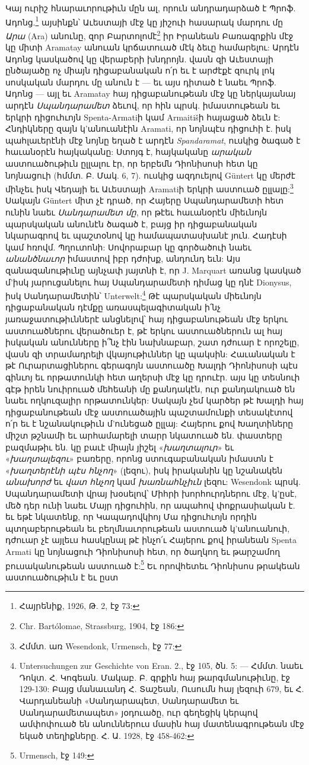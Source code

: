 \documentclass{article}
\begin{document}
{Կայ ուրիշ հնարաւորութիւն մըն ալ, որուն անդրադարձած է Պրոֆ. Ադոնց.\footnote{Հայրենիք, 1926, Թ. 2, էջ 73:} այսինքն՝ Աւեստայի մէջ կը յիշուի հասարակ մարդու մը \emph{Արա} (Ara) անունը, զոր Բարտոլոմէ\footnote{Chr. Bartólomae, Strassburg, 1904, էջ 186:} իր Իրանեան Բառագրքին մէջ կը միտի Aramatay անուան կրճատուած մէկ ձեւը համարելու: Արդէն Ադոնց կասկածով կը վերաբերի խնդրոյն. վասն զի Աւեստայի ընծայածը ոչ միայն դիցաբանական ո՛ր եւ է արժէքէ զուրկ լոկ սոսկական մարդու մը անուն է — եւ այս դիտած է նաեւ Պրոֆ. Ադոնց — այլ եւ Aramatay հայ դիցաբանութեան մէջ կը ներկայանայ արդէն \emph{Սպանդարամետ} ձեւով, որ հին պրսկ. իմաստութեան եւ երկրի դիցուհւոյն Spenta-Armatiի կամ Armaitišի հայացած ձեւն է: Հնդիկները զայն կ'անուանէին Aramati, որ նոյնպէս դիցուհի է. իսկ պահլաւերէնի մէջ նոյնը եղած է արդէն \emph{Spandaramat}, ուսկից ծագած է հաւանօրէն հայկականը: Ստոյգ է, հայկականը \emph{արական} աստուածութիւն ըլլալու էր, որ երբեմն Դիոնիսոսի հետ կը նոյնացուի (հմմտ. Բ. Մակ. 6, 7). ուսկից ազդուելով Güntert կը մերժէ մինչեւ իսկ Վեդայի եւ Աւեստայի Aramatiի երկրի աստուած ըլլալը:\footnote{Հմմտ. առ Wesendonk, Urmensch, էջ 77:} Սակայն Güntert միտ չէ դրած, որ Հայերը Սպանդարամետի հետ ունին նաեւ \emph{Սանդարամետ մը}, որ թէեւ հաւանօրէն միեւնոյն պարսկական անունէն ծագած է, բայց իր դիցաբանական նկարագրով եւ պաշտօնով կը համապատասխանէ յուն. Հադէսի կամ հռովմ. Պղուտոնի: Սովորաբար կը գործածուի նաեւ \emph{անանծնաւոր} իմաստով իբր դժոխք, անդունդ եւն: Այս զանազանութիւնը այնչափ յայտնի է, որ J. Marquart առանց կասկած մ'իսկ յարուցանելու հայ Սպանդարամետի դիմաց կը դնէ Dionysus, իսկ Սանդարամետին՝ Unterwelt:\footnote{Untersuchungen zur Geschichte von Eran. 2., էջ 105, ծն. 5: — Հմմտ. նաեւ Դոկտ. Հ. Կոգեան. Մակաբ. Բ. գրքին հայ թարգմանութիւնը, էջ 129-130: Բայց մանաւանդ Հ. Տաշեան, Ուսումն հայ լեզուի 679, եւ Հ. Վարդանեանի «Սանդարապետ, Սանդարամետ եւ Սանդարամետապետ» յօդուածը, ուր գեղեցիկ կերպով ամփոփուած են անուններուս մասին հայ մատենագրութեան մէջ եկած տեղիքները. Հ. Ա. 1928, էջ 458-462:} Թէ պարսկական միեւնոյն դիցաբանական դէմքը առասպելագիտական ի՛նչ յառաջատութիւններէ անցնելով՝ հայ դիցաբանութեան մէջ երկու աստուածներու վերածուեր է, թէ երկու աստուածներուն ալ հայ իսկական անունները ի՞նչ էին նախնաբար, շատ դժուար է որոշելը, վասն զի տրամադրելի վկայութիւններ կը պակսին: Հաւանական է թէ Ուրարտացիներու գերագոյն աստուածը Խալդի Դիոնիսոսի պէս գինւոյ եւ որթատունկի հետ աղերսի մէջ կը դրուէր. այս կը տեսնուի գէթ իրեն նուիրուած մեհեանի մը քանդակէն, ուր քանդակուած են նաեւ ողկուզալիր որթատունկեր: Սակայն չեմ կարծեր թէ Խալդի հայ դիցաբանութեան մէջ աստուածային պաշտամունքի տեսակէտով ո՛ր եւ է նշանակութիւն մ'ունեցած ըլլայ: Հայերու քով Խաղտիները միշտ թշնամի եւ արհամարելի տարր նկատուած են. փաստերը բազմաթիւ են. կը բաւէ միայն յիշել «\emph{խաղտալուր}» եւ «\emph{խաղտալեզու}» բառերը, որոնց ստուգաբանական իմաստն է «\emph{խաղտերէնի պէս հնչող}» (լեզու), իսկ իրականին կը նշանակեն \emph{անախորժ} եւ \emph{վատ հնչող} կամ \emph{խառնահնչիւն} լեզու: Wesendonk պրսկ. Սպանդարամետի վրայ խօսելով՝ Միհրի խորհուրդներու մէջ, կ'ըսէ, մեծ դեր ունի նաեւ Մայր դիցուհին, որ ապահով փոքրասիական է. եւ եթէ նկատենք, որ Կապադովկիոյ Մա դիցուհւոյն որդին պտղաբերութեան եւ բեղմնաւորութեան աստուած կ'անուանուի, դժուար չէ այլեւս հասկընալ թէ ինչո՛ւ Հայերու քով իրանեան Spenta Armati կը նոյնացուի Դիոնիսոսի հետ, որ ծաղկող եւ թարշամող բուսականութեան աստուած է:\footnote{Urmensch, էջ 149:} Եւ որովհետեւ Դիոնիսոս թրակեան աստուածութիւն է եւ ըստ }
\end{document}
